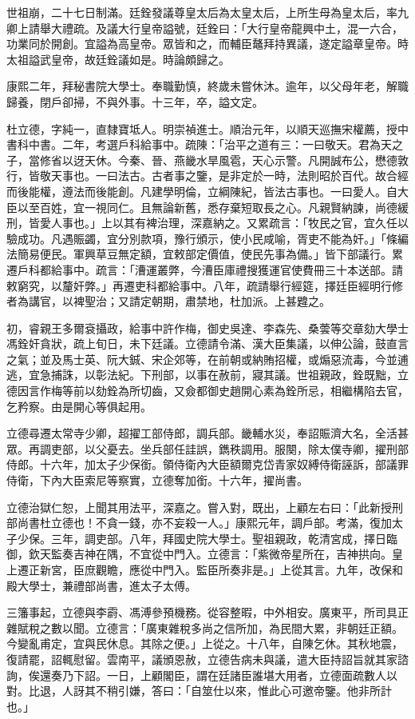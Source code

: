 \begin{pinyinscope}
世祖崩，二十七日制滿。廷銓發議尊皇太后為太皇太后，上所生母為皇太后，率九卿上請舉大禮疏。及議大行皇帝謚號，廷銓曰：「大行皇帝龍興中土，混一六合，功業同於開創。宜謚為高皇帝。眾皆和之，而輔臣鼇拜持異議，遂定謚章皇帝。時太祖謚武皇帝，故廷銓議如是。時論頗歸之。

康熙二年，拜秘書院大學士。奉職勤慎，終歲未嘗休沐。逾年，以父母年老，解職歸養，閉戶卻掃，不與外事。十三年，卒，謚文定。

杜立德，字純一，直隸寶坻人。明崇禎進士。順治元年，以順天巡撫宋權薦，授中書科中書。二年，考選戶科給事中。疏陳：「治平之道有三：一曰敬天。君為天之子，當修省以迓天休。今秦、晉、燕畿水旱風雹，天心示警。凡開誠布公，懋德敦行，皆敬天事也。一曰法古。古者事之鑒，是非定於一時，法則昭於百代。故合經而後能權，遵法而後能創。凡建學明倫，立綱陳紀，皆法古事也。一曰愛人。自大臣以至百姓，宜一視同仁。且無論新舊，悉存棄短取長之心。凡親賢納諫，尚德緩刑，皆愛人事也。」上以其有裨治理，深嘉納之。又累疏言：「牧民之官，宜久任以驗成功。凡遇賑蠲，宜分別款項，豫行頒示，使小民咸喻，胥吏不能為奸。」「條編法簡易便民。軍興草豆無定額，宜敕部定價值，使民先事為備。」皆下部議行。累遷戶科都給事中。疏言：「漕運叢弊，今漕臣庫禮搜獲運官使費冊三十本送部。請敕窮究，以釐奸弊。」再遷吏科都給事中。八年，疏請舉行經筵，擇廷臣經明行修者為講官，以裨聖治；又請定朝期，肅禁地，杜加派。上甚韙之。

初，睿親王多爾袞攝政，給事中許作梅，御史吳達、李森先、桑蕓等交章劾大學士馮銓奸貪狀，疏上旬日，未下廷議。立德請令滿、漢大臣集議，以伸公論，鼓直言之氣；並及馬士英、阮大鋮、宋企郊等，在前朝或納賄招權，或煽惡流毒，今並逋逃，宜急捕誅，以彰法紀。下刑部，以事在赦前，寢其議。世祖親政，銓既黜，立德因言作梅等前以劾銓為所切齒，又僉都御史趙開心素為銓所忌，相繼構陷去官，乞矜察。由是開心等俱起用。

立德尋遷太常寺少卿，超擢工部侍郎，調兵部。畿輔水災，奉詔賑濟大名，全活甚眾。再調吏部，以父憂去。坐兵部任詿誤，鐫秩調用。服闋，除太僕寺卿，擢刑部侍郎。十六年，加太子少保銜。領侍衛內大臣額爾克岱青家奴縛侍衛誣訴，部議罪侍衛，下內大臣索尼等察實，立德奪加銜。十六年，擢尚書。

立德治獄仁恕，上聞其用法平，深嘉之。嘗入對，既出，上顧左右曰：「此新授刑部尚書杜立德也！不貪一錢，亦不妄殺一人。」康熙元年，調戶部。考滿，復加太子少保。三年，調吏部。八年，拜國史院大學士。聖祖親政，乾清宮成，擇日臨御，欽天監奏吉神在隅，不宜從中門入。立德言：「紫微帝星所在，吉神拱向。皇上遷正新宮，臣庶觀瞻，應從中門入。監臣所奏非是。」上從其言。九年，改保和殿大學士，兼禮部尚書，進太子太傅。

三籓事起，立德與李霨、馮溥參預機務。從容整暇，中外相安。廣東平，所司具正雜賦稅之數以聞。立德言：「廣東雜稅多尚之信所加，為民間大累，非朝廷正額。今變亂甫定，宜與民休息。其除之便。」上從之。十八年，自陳乞休。其秋地震，復請罷，詔輒慰留。雲南平，議頒恩赦，立德告病未與議，遣大臣持詔旨就其家諮詢，俟還奏乃下詔。一日，上顧閣臣，謂在廷諸臣誰堪大用者，立德面疏數人以對。比退，人訝其不稍引嫌，答曰：「自筮仕以來，惟此心可邀帝鑒。他非所計也。」


\end{pinyinscope}
